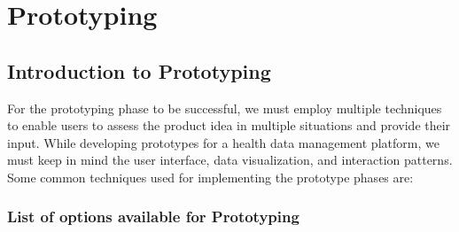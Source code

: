 \pagestyle{fancy}
\thispagestyle{fancy}
\chapter{Prototyping}
\section{Introduction to Prototyping}

For the prototyping phase to be successful, we must employ multiple techniques to enable users to assess the product idea in multiple situations and provide their input. While developing prototypes for a health data management platform, we must keep in mind the user interface, data visualization, and interaction patterns. Some common techniques used for implementing the prototype phases are:

\subsection{List of options available for Prototyping}

